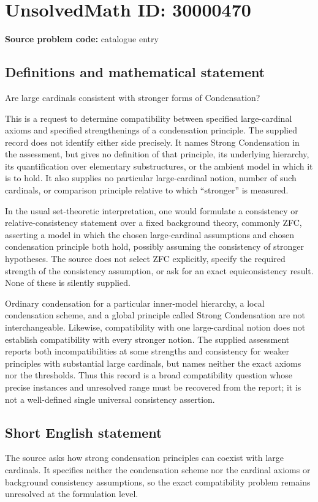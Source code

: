 \documentclass[11pt]{article}
\begin{document}
\section*{UnsolvedMath ID: 30000470}
\textbf{Source problem code:} catalogue entry
\subsection{Definitions and mathematical statement}
Are large cardinals consistent with stronger forms of Condensation?

This is a request to determine compatibility between specified large-cardinal axioms and specified strengthenings of a condensation principle. The supplied record does not identify either side precisely. It names Strong Condensation in the assessment, but gives no definition of that principle, its underlying hierarchy, its quantification over elementary substructures, or the ambient model in which it is to hold. It also supplies no particular large-cardinal notion, number of such cardinals, or comparison principle relative to which ``stronger'' is measured.

In the usual set-theoretic interpretation, one would formulate a consistency or relative-consistency statement over a fixed background theory, commonly ZFC, asserting a model in which the chosen large-cardinal assumptions and chosen condensation principle both hold, possibly assuming the consistency of stronger hypotheses. The source does not select ZFC explicitly, specify the required strength of the consistency assumption, or ask for an exact equiconsistency result. None of these is silently supplied.

Ordinary condensation for a particular inner-model hierarchy, a local condensation scheme, and a global principle called Strong Condensation are not interchangeable. Likewise, compatibility with one large-cardinal notion does not establish compatibility with every stronger notion. The supplied assessment reports both incompatibilities at some strengths and consistency for weaker principles with substantial large cardinals, but names neither the exact axioms nor the thresholds. Thus this record is a broad compatibility question whose precise instances and unresolved range must be recovered from the report; it is not a well-defined single universal consistency assertion.
\subsection{Short English statement}
The source asks how strong condensation principles can coexist with large cardinals. It specifies neither the condensation scheme nor the cardinal axioms or background consistency assumptions, so the exact compatibility problem remains unresolved at the formulation level.
\end{document}
